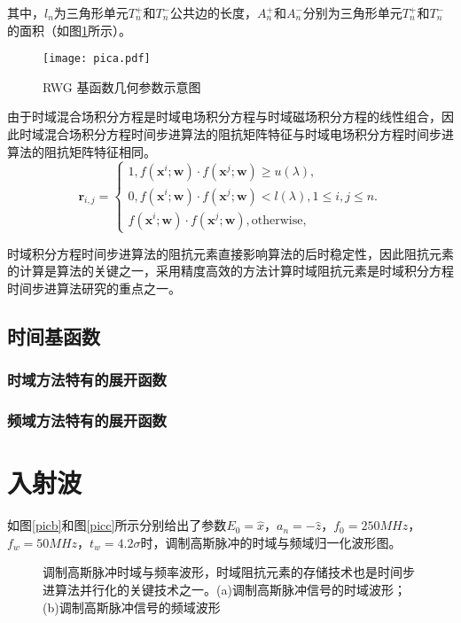 \documentclass[master]{thesis-uestc}
\begin{document}
其中，$l_n$为三角形单元$T_n^+$和$T_n^-$公共边的长度，$A_n^+$和$A_n^-$分别为三角形单元$T_n^+$和$T_n^-$的面积（如图\ref{pica}所示）。

\begin{figure}[h]
\texttt{[image: pica.pdf]}
\caption{RWG 基函数几何参数示意图}
\label{pica}
\end{figure}

由于时域混合场积分方程是时域电场积分方程与时域磁场积分方程的线性组合，因此时域混合场积分方程时间步进算法的阻抗矩阵特征与时域电场积分方程时间步进算法的阻抗矩阵特征相同。
\begin{equation}
\label{latent_binary_variable}
\bm{r}_{i,j}=
\begin{cases}
1,f(\bm{x}^{i};\bm{w})\cdot f(\bm{x}^{j};\bm{w})\geq u(\lambda),\\
0,f(\bm{x}^{i};\bm{w})\cdot f(\bm{x}^{j};\bm{w})< l(\lambda), 1\leq i,j\leq n.\\
f(\bm{x}^{i};\bm{w})\cdot f(\bm{x}^{j};\bm{w}),\text{otherwise},
\end{cases}
\end{equation}

时域积分方程时间步进算法的阻抗元素直接影响算法的后时稳定性，因此阻抗元素的计算是算法的关键之一，采用精度高效的方法计算时域阻抗元素是时域积分方程时间步进算法研究的重点之一。


\subsection{时间基函数}

\subsubsection{时域方法特有的展开函数}

\subsubsection{频域方法特有的展开函数}

\section{入射波}

如图\ref{picb}和图\ref{picc}所示分别给出了参数$E_0=\hat{x}$，$a_n=-\hat{z}$，$f_0=250MHz$，$f_w=50MHz$，$t_w=4.2\sigma$时，调制高斯脉冲的时域与频域归一化波形图。

\begin{figure}[h]
\caption{调制高斯脉冲时域与频率波形，时域阻抗元素的存储技术也是时间步进算法并行化的关键技术之一。(a)调制高斯脉冲信号的时域波形；(b)调制高斯脉冲信号的频域波形}
\label{fig1}
\end{figure}
\end{document}
